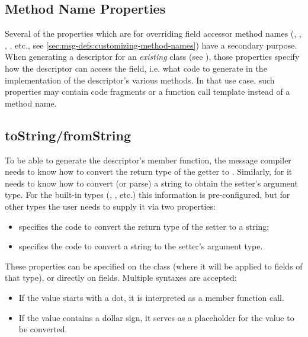 \subsection{Method Name Properties}
\label{sec:msg-defs:descriptor-method-name-properties}

Several of the properties which are for overriding field accessor method names
(, , , ,
etc., see \ref{sec:msg-defs:customizing-method-names}) have a secondary purpose.
When generating a descriptor for an \textit{existing} class (see
), those properties specify how the descriptor can access
the field, i.e. what code to generate in the implementation of the descriptor's
various methods. In that use case, such properties may contain code fragments or
a function call template instead of a method name.


\subsection{toString/fromString}
\label{sec:msg-defs:descriptor-tostring}

To be able to generate the descriptor's  member
function, the message compiler needs to know how to convert the return type of
the getter to . Similarly, for  it
needs to know how to convert (or parse) a string to obtain the setter's argument
type. For the built-in types (, , etc.) this information is
pre-configured, but for other types the user needs to supply it via two
properties:

\begin{itemize}
  \item {} specifies the code to convert the return type of the setter to a string;
  \item {} specifies the code to convert a string to the setter's argument type.
\end{itemize}

These properties can be specified on the class (where it will be applied to
fields of that type), or directly on fields. Multiple syntaxes are accepted:

\begin{itemize}
  \item If the value starts with a dot, it is interpreted as a member function call.
  \item If the value contains a dollar sign, it serves as a placeholder for the
        value to be converted.
\end{itemize}

